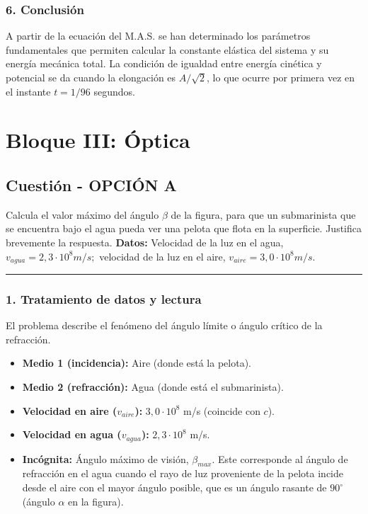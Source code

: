 \subsubsection*{6. Conclusión}
\begin{cajaconclusion}
A partir de la ecuación del M.A.S. se han determinado los parámetros fundamentales que permiten calcular la constante elástica del sistema y su energía mecánica total. La condición de igualdad entre energía cinética y potencial se da cuando la elongación es $A/\sqrt{2}$, lo que ocurre por primera vez en el instante $t=1/96$ segundos.
\end{cajaconclusion}

\newpage

\section{Bloque III: Óptica}
\label{sec:optica_2011_sep_ext}

\subsection{Cuestión - OPCIÓN A}
\label{subsec:3A_2011_sep_ext}

\begin{cajaenunciado}
Calcula el valor máximo del ángulo $\beta$ de la figura, para que un submarinista que se encuentra bajo el agua pueda ver una pelota que flota en la superficie. Justifica brevemente la respuesta.
\textbf{Datos:} Velocidad de la luz en el agua, $v_{agua}=2,3\cdot10^{8}m/s;$ velocidad de la luz en el aire, $v_{aire}=3,0\cdot10^{8}m/s$.
\end{cajaenunciado}
\hrule

\subsubsection*{1. Tratamiento de datos y lectura}
El problema describe el fenómeno del ángulo límite o ángulo crítico de la refracción.
\begin{itemize}
    \item \textbf{Medio 1 (incidencia):} Aire (donde está la pelota).
    \item \textbf{Medio 2 (refracción):} Agua (donde está el submarinista).
    \item \textbf{Velocidad en aire ($v_{aire}$):} $3,0 \cdot 10^8$ m/s (coincide con $c$).
    \item \textbf{Velocidad en agua ($v_{agua}$):} $2,3 \cdot 10^8$ m/s.
    \item \textbf{Incógnita:} Ángulo máximo de visión, $\beta_{max}$. Este corresponde al ángulo de refracción en el agua cuando el rayo de luz proveniente de la pelota incide desde el aire con el mayor ángulo posible, que es un ángulo rasante de $90^\circ$ (ángulo $\alpha$ en la figura).
\end{itemize}

